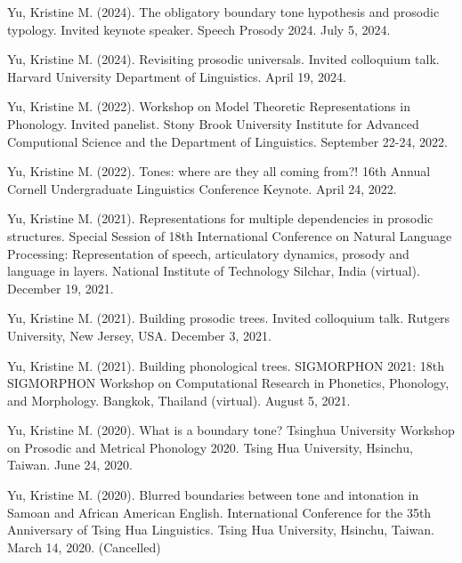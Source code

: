 \documentclass[10pt]{article}
\begin{document}
\begin{bibenum}


\item Yu, Kristine M. (2024). The obligatory boundary tone hypothesis and prosodic typology. Invited keynote speaker. Speech Prosody 2024. July 5, 2024.

\item Yu, Kristine M. (2024). Revisiting prosodic universals. Invited colloquium talk. Harvard University Department of Linguistics. April 19, 2024.

\item Yu, Kristine M. (2022). Workshop on Model Theoretic Representations in Phonology. Invited panelist. Stony Brook University Institute for Advanced Computional Science and the Department of Linguistics. September 22-24, 2022.

\item Yu, Kristine M. (2022). Tones: where are they all coming from?! 16th Annual Cornell Undergraduate Linguistics Conference Keynote. April 24, 2022.

\item Yu, Kristine M. (2021). Representations for multiple dependencies in prosodic structures. Special Session of 18th International Conference on Natural Language Processing: Representation of speech, articulatory dynamics, prosody and language in layers. National Institute of Technology Silchar, India (virtual). December 19, 2021.

\item Yu, Kristine M. (2021). Building prosodic trees. Invited colloquium talk. Rutgers University, New Jersey, USA. December 3, 2021.

\item Yu, Kristine M. (2021). Building phonological trees. SIGMORPHON 2021: 18th SIGMORPHON Workshop on Computational Research in Phonetics, Phonology, and Morphology. Bangkok, Thailand (virtual).  August 5, 2021.

\item Yu, Kristine M. (2020). What is a boundary tone? Tsinghua University Workshop on Prosodic and Metrical Phonology 2020. Tsing Hua University, Hsinchu, Taiwan.  June 24, 2020.

\item Yu, Kristine M. (2020). Blurred boundaries between tone and intonation in Samoan and African American English. International Conference for the 35th Anniversary of Tsing Hua Linguistics. Tsing Hua University, Hsinchu, Taiwan.  March 14, 2020. (Cancelled)


\end{bibenum}
\end{document}
